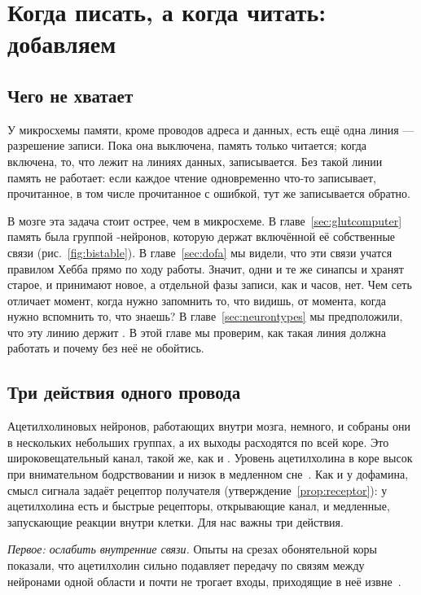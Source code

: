 \chapter{Когда писать, а когда читать: добавляем }
\label{sec:acet}

\section{Чего не хватает}

У микросхемы памяти, кроме проводов адреса и данных, есть ещё одна линия --- разрешение записи. Пока она выключена, память только читается; когда включена, то, что лежит на линиях данных, записывается. Без такой линии память не работает: если каждое чтение одновременно что-то записывает, прочитанное, в том числе прочитанное с ошибкой, тут же записывается обратно.

В мозге эта задача стоит острее, чем в микросхеме. В главе~\ref{sec:glutcomputer} память была группой -нейронов, которую держат включённой её собственные связи (рис.~\ref{fig:bistable}). В главе~\ref{sec:dofa} мы видели, что эти связи учатся правилом Хебба прямо по ходу работы. Значит, одни и те же синапсы и хранят старое, и принимают новое, а отдельной фазы записи, как и часов, нет. Чем сеть отличает момент, когда нужно запомнить то, что видишь, от момента, когда нужно вспомнить то, что знаешь? В главе~\ref{sec:neurontypes} мы предположили, что эту линию держит . В этой главе мы проверим, как такая линия должна работать и почему без неё не обойтись.

\section{Три действия одного провода}

Ацетилхолиновых нейронов, работающих внутри мозга, немного, и собраны они в нескольких небольших группах, а их выходы расходятся по всей коре. Это широковещательный канал, такой же, как  и . Уровень ацетилхолина в коре высок при внимательном бодрствовании и низок в медленном сне~\cite{Hasselmo1999}. Как и у дофамина, смысл сигнала задаёт рецептор получателя (утверждение~\ref{prop:receptor}): у ацетилхолина есть и быстрые рецепторы, открывающие канал, и медленные, запускающие реакции внутри клетки. Для нас важны три действия.

\emph{Первое: ослабить внутренние связи.} Опыты на срезах обонятельной коры показали, что ацетилхолин сильно подавляет передачу по связям между нейронами одной области и почти не трогает входы, приходящие в неё извне~\cite{HasselmoBower1992}.

